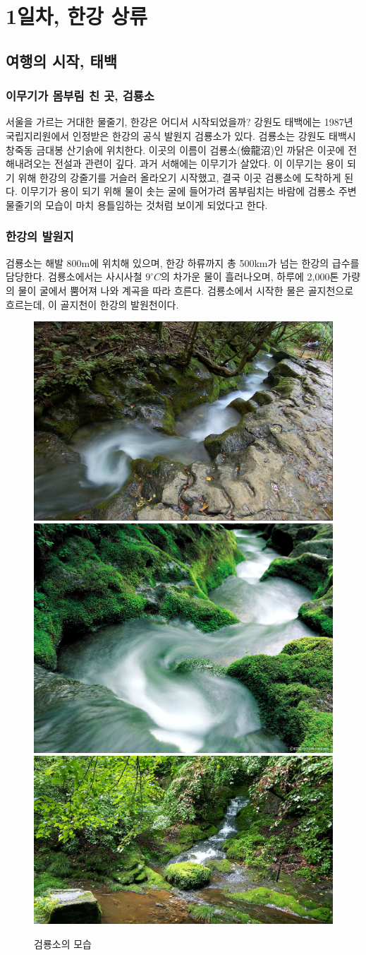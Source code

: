 
\chapter{1일차, 한강 상류}
\section{여행의 시작, 태백}
\subsection{이무기가 몸부림 친 곳, 검룡소}
서울을 가르는 거대한 물줄기, 한강은 어디서 시작되었을까? 
강원도 태백에는 1987년 국립지리원에서 인정받은 한강의 공식 발원지 검룡소가 있다. 
검룡소는 강원도 태백시 창죽동 금대봉 산기슭에 위치한다. 
이곳의 이름이 검룡소(儉龍沼)인 까닭은 이곳에 전해내려오는 전설과 관련이 깊다. 과거 서해에는 이무기가 살았다. 
이 이무기는 용이 되기 위해 한강의 강줄기를 거슬러 올라오기 시작했고, 결국 이곳 검룡소에 도착하게 된다. 
이무기가 용이 되기 위해 물이 솟는 굴에 들어가려 몸부림치는 바람에 검룡소 주변 물줄기의 모습이 마치 용틀임하는 것처럼 보이게 되었다고 한다. 

\subsection{한강의 발원지}
검룡소는 해발 800m에 위치해 있으며, 한강 하류까지 총 500km가 넘는 한강의 급수를 담당한다. 
검룡소에서는 사시사철 $9^\circ C$의 차가운 물이 흘러나오며, 
하루에 2,000톤 가량의 물이 굴에서 뿜어져 나와 계곡을 따라 흐른다. 
검룡소에서 시작한 물은 골지천으로 흐르는데, 이 골지천이 한강의 발원천이다. 

\begin{figure}[ht]
    \centering
    \includegraphics[width=.32\textwidth]{s_img/검룡소_사진.jpg}
    \includegraphics[width=.32\textwidth]{s_img/검룡소_사진2.jpeg}
    \includegraphics[width=.32\textwidth]{s_img/태백검룡소_사진_low.jpg}
    \caption{검룡소의 모습}
    \label{fig:my_label_s1}
 \end{figure}


